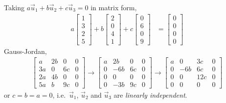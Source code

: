\documentclass[a4paper,norsk,12pt]{article}
\begin{document}
Taking $a\vec{u}_1 + b\vec{u}_2 + c\vec{u}_3 = 0$ in matrix form,
\begin{align*}
  a
    \left[
      \begin{array}{c}
        1 \\ 3 \\ 2 \\ 5
      \end{array}
    \right]
  + b
    \left[
      \begin{array}{c}
        2 \\ 0 \\ 4 \\ 1
      \end{array}
    \right]
  + c
    \left[
      \begin{array}{c}
        0 \\ 6 \\ 0 \\ 9
      \end{array}
    \right]
  &=
    \left[
      \begin{array}{c}
        0 \\ 0 \\ 0 \\ 0
      \end{array}
    \right]
\end{align*}
Gauss-Jordan,
\begin{align*}
  \left[
    \begin{array}{ccc|c}
       a & 2b &  0 & 0 \\
      3a &  0 & 6c & 0 \\
      2a & 4b &  0 & 0 \\
      5a &  b & 9c & 0
    \end{array}
  \right] \rightarrow
  \left[
    \begin{array}{ccc|c}
       a & 2b &  0 & 0 \\
       0 &-6b & 6c & 0 \\
       0 &  0 &  0 & 0 \\
       0 &-3b & 9c & 0
    \end{array}
  \right] \rightarrow
  \left[
    \begin{array}{ccc|c}
       a &  0 & 3c & 0 \\
       0 &-6b & 6c & 0 \\
       0 &  0 &12c & 0 \\
       0 &  0 &  0 & 0
    \end{array}
  \right]
\end{align*}
or $c=b=a=0$, i.e.~$\vec{u}_1$, $\vec{u}_2$ and $\vec{u}_3$ are \textit{linearly independent}.
\end{document}
